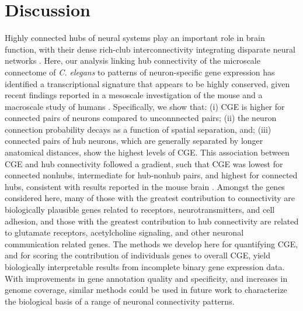 \documentclass[10pt,letterpaper]{article}
\begin{document}
{\section*{Discussion}
Highly connected hubs of neural systems play an important role in brain function, with their dense rich-club interconnectivity integrating disparate neural networks \cite{vandenHeuvel:2013ge, Fornito2015, deReus:2013cy, vandenHeuvel:2013ij}.
Here, our analysis linking hub connectivity of the microscale connectome of \emph{C. elegans} to patterns of neuron-specific gene expression has identified a transcriptional signature that appears to be highly conserved, given recent findings reported in a mesoscale investigation of the mouse \cite{Fulcher:2016ck} and a macroscale study of humans \cite{Vertes2016a}.
Specifically, we show that:
(i) CGE is higher for connected pairs of neurons compared to unconnnected pairs;
(ii) the neuron connection probability decays as a function of spatial separation, and;
(iii) connected pairs of hub neurons, which are generally separated by longer anatomical distances, show the highest levels of CGE.
This association between CGE and hub connectivity followed a gradient, such that CGE was lowest for connected nonhubs, intermediate for hub-nonhub pairs, and highest for connected hubs, consistent with results reported in the mouse brain \cite{Fulcher:2016ck}.
Amongst the genes considered here, many of those with the greatest contribution to connectivity are biologically plausible genes related to receptors, neurotransmitters, and cell adhesion, and those with the greatest contribution to hub connectivity are related to glutamate receptors, acetylcholine signaling, and other neuronal communication related genes.
The methods we develop here for quantifying CGE, and for scoring the contribution of individuals genes to overall CGE, yield biologically interpretable results from incomplete binary gene expression data.
With improvements in gene annotation quality and specificity, and increases in genome coverage, similar methods could be used in future work to characterize the biological basis of a range of neuronal connectivity patterns.

}
\end{document}
